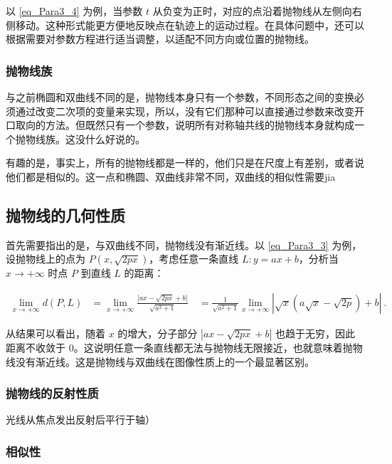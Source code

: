 以 \autoref{eq_Para3_4} 为例，当参数 $t$ 从负变为正时，对应的点沿着抛物线从左侧向右侧移动。这种形式能更方便地反映点在轨迹上的运动过程。在具体问题中，还可以根据需要对参数方程进行适当调整，以适配不同方向或位置的抛物线。

\subsubsection{抛物线族}

与之前椭圆和双曲线不同的是，抛物线本身只有一个参数，不同形态之间的变换必须通过改变二次项的变量来实现，所以，没有它们那种可以直接通过参数来改变开口取向的方法。但既然只有一个参数，说明所有对称轴共线的抛物线本身就构成一个抛物线族。这没什么好说的。

有趣的是，事实上，所有的抛物线都是一样的，他们只是在尺度上有差别，或者说他们都是相似的。这一点和椭圆、双曲线非常不同，双曲线的相似性需要jia

\subsection{抛物线的几何性质}

首先需要指出的是，与双曲线不同，抛物线没有渐近线。以 \autoref{eq_Para3_3} 为例，设抛物线上的点为 $P(x, \sqrt{2px})$，考虑任意一条直线 $L: y = ax + b$，分析当 $x \to +\infty$ 时点 $P$ 到直线 $L$ 的距离：

\begin{equation}
\begin{split}
\lim_{x \to +\infty} d(P, L)
&= \lim_{x \to +\infty} \frac{|ax - \sqrt{2px} + b|}{\sqrt{a^2 + 1}}\
&= \frac{1}{\sqrt{a^2 + 1}} \lim_{x \to +\infty} | \sqrt{x} \left( a\sqrt{x} - \sqrt{2p} \right) + b |~.
\end{split}
\end{equation}

从结果可以看出，随着 $x$ 的增大，分子部分 $|ax - \sqrt{2px} + b|$ 也趋于无穷，因此距离不收敛于 $0$。这说明任意一条直线都无法与抛物线无限接近，也就意味着抛物线没有渐近线。这是抛物线与双曲线在图像性质上的一个最显著区别。



\subsubsection{抛物线的反射性质}
光线从焦点发出反射后平行于轴）

\subsubsection{相似性}

